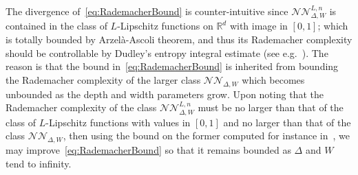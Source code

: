 \documentclass{article}
\numberwithin{equation}{section}
\theoremstyle{definition}
\begin{document}
The divergence of~\eqref{eq:RademacherBound} is counter-intuitive since $\mathcal{NN}_{\Delta,W}^{L,n}$ is contained in the class of $L$-Lipschitz functions on $\mathbb{R}^d$ with image in $[0,1]$; which is totally bounded by Arzel\`a-Ascoli theorem, and thus its Rademacher complexity should be controllable by Dudley's entropy integral estimate (see e.g.~\citep[Corollary 2.2.8]{VanderVaart_WeakConvEmpiricalProcesses}).  The reason is that the bound in~\eqref{eq:RademacherBound} is inherited from bounding the Rademacher complexity of the larger class $\mathcal{NN}_{\Delta,W}$ which becomes unbounded as the depth and width parameters grow.  Upon noting that the Rademacher complexity of the class $\mathcal{NN}_{\Delta,W}^{L,n}$ must be no larger than that of the class of $L$-Lipschitz functions with values in $[0,1]$ and no larger than that of the class $\mathcal{NN}_{\Delta,W}$, then using the bound on the former computed for instance in~\cite[Lemma 25]{HouKratsios_JMLR_2023}, we may improve~\eqref{eq:RademacherBound} so that it remains bounded as $\Delta$ and $W$ tend to infinity.
\end{document}
